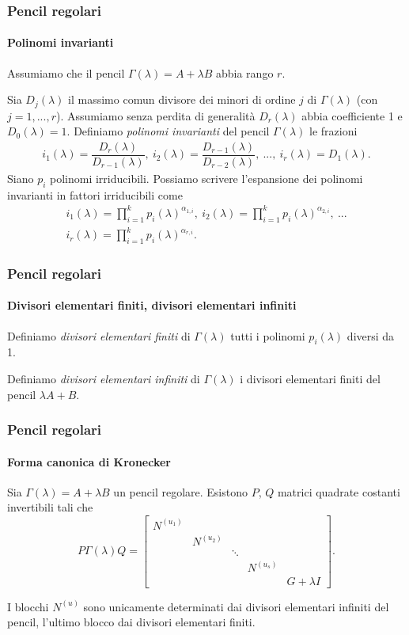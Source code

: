 \begin{frame}
	\frametitle{Pencil regolari}
	\framesubtitle{Polinomi invarianti}
	Assumiamo che il pencil $\Gamma(\lambda)=A+\lambda B$ abbia rango $r$.

	Sia \(D_{j}(\lambda)\) il massimo comun divisore dei minori di ordine $j$
	di $\Gamma(\lambda)$ (con $j=1, ..., r$). Assumiamo senza perdita di generalit\`a
	$D_r(\lambda)$ abbia coefficiente 1 e $D_0(\lambda)=1$.
	Definiamo \emph{polinomi invarianti} del
	pencil \(\Gamma(\lambda)\) le frazioni
	\begin{gather*}
		i_{1}(\lambda) = \dfrac{D_{r}(\lambda)}{D_{r-1}(\lambda)}, \
		i_{2}(\lambda) = \dfrac{D_{r-1}(\lambda)}{D_{r-2}(\lambda)}, \
		..., \
		i_{r}(\lambda) = D_{1}(\lambda).
	\end{gather*}
	\onslide<2-> Siano $p_i$ polinomi irriducibili. Possiamo scrivere l'espansione dei polinomi invarianti
	in fattori irriducibili come
	\begin{gather*}
		i_{1}(\lambda) = \prod_{i=1}^{k}p_{i}(\lambda)^{\alpha_{1, i}}, \
		i_{2}(\lambda) = \prod_{i=1}^{k}p_{i}(\lambda)^{\alpha_{2, i}}, \
		... \\
		i_{r}(\lambda) = \prod_{i=1}^{k}p_{i}(\lambda)^{\alpha_{r, i}}.
	\end{gather*}
\end{frame}


\begin{frame}
	\frametitle{Pencil regolari}
	\framesubtitle{Divisori elementari finiti, divisori elementari infiniti}
	\begin{definition}
		Definiamo \emph{divisori elementari finiti} di \(\Gamma(\lambda)\) tutti i
		polinomi $p_i(\lambda)$ diversi da 1.
	\end{definition}
	\begin{definition}[Divisori elementari infiniti]
		Definiamo
		\emph{divisori elementari infiniti} di \(\Gamma(\lambda)\) i divisori elementari finiti
		del pencil $\lambda A + B$.
	\end{definition}
\end{frame}


\begin{frame}
	\frametitle{Pencil regolari}
	\framesubtitle{Forma canonica di Kronecker}
	\begin{theorem}
		Sia \(\Gamma(\lambda) = A+\lambda B\) un pencil regolare. Esistono $P$, $Q$ matrici
		quadrate costanti invertibili tali che
		\[
			P\Gamma(\lambda)Q=\begin{bmatrix}
			N^{(u_1)} \\
			& N^{(u_2)} \\
			&& \ddots \\
			&&& N^{(u_s)} \\
			&&&& G + \lambda I
		\end{bmatrix}.
		\]
	\end{theorem}
	\onslide<2-> I blocchi $N^{(u)}$ sono unicamente determinati dai divisori elementari infiniti
	del pencil, l'ultimo blocco dai divisori elementari finiti.
\end{frame}
